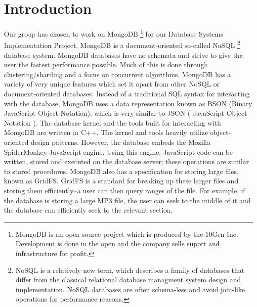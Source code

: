\documentclass{../dependencies/acm_proc_article-sp}
\begin{document}
%

%

\section{Introduction}
Our group has chosen to work on MongoDB 
\footnote{MongoDB is an open source project which is produced by the 10Gen Inc.
          Development is done in the open and the company sells suport and infrastructure for profit. }
          for our Database Systems
Implementation Project. MongoDB is a document-oriented so-called NoSQL 
\footnote{ NoSQL is a relatively new term, which describes a family of databases that differ from the classical relational database managment system design and implementation. NoSQL databases are often schema-less and avoid join-like operations for performance reasons. }
database system. MongoDB databases have no schemata and strive to give the user
the fastest performance possible. Much of this is done through clustering/sharding
and a focus on concurrent algorithms. MongoDB has a variety of very unique
features which set it apart from other NoSQL or document-oriented databases.
Instead of a traditional SQL syntax for interacting with the database, MongoDB uses
a data representation known as BSON (Binary JavaScript Object Notation), which is very similar
to JSON ( JavaScript Object Notation ).
%
The database kernel and the tools built for interacting with MongoDB are written in
C++. The kernel and tools heavily utilize object-oriented design patterns.
However, the database embeds the Mozilla SpiderMonkey JavaScript engine.
Using this engine, JavaScript code can be written, stored and executed on the database server; these
operations are similar to stored procedures. MongoDB also has a specification for storing
large files, known as GridFS. GridFS is a standard for breaking up these larger
files and storing them efficiently--a user can then query ranges of the file. For example, if the
database is storing a large MP3 file, the user can seek to the middle of it and the database can
efficiently seek to the relevant section.
\end{document}
